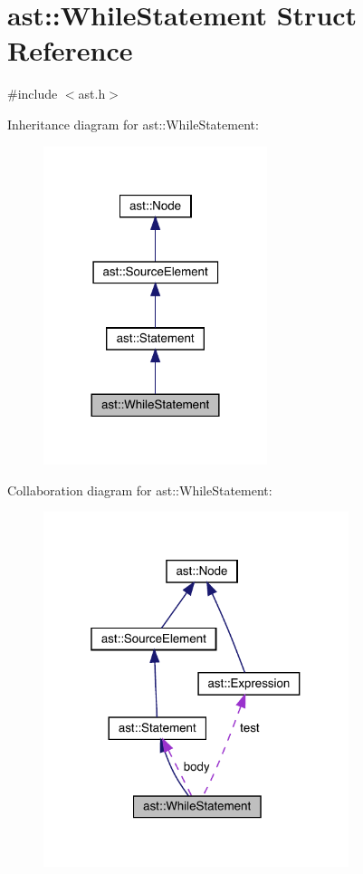\hypertarget{structast_1_1_while_statement}{}\section{ast\+:\+:While\+Statement Struct Reference}
\label{structast_1_1_while_statement}


{\ttfamily \#include $<$ast.\+h$>$}



Inheritance diagram for ast\+:\+:While\+Statement\+:
\nopagebreak
\begin{figure}[H]
\begin{center}
\leavevmode
\includegraphics[width=185pt]{structast_1_1_while_statement__inherit__graph}
\end{center}
\end{figure}


Collaboration diagram for ast\+:\+:While\+Statement\+:
\nopagebreak
\begin{figure}[H]
\begin{center}
\leavevmode
\includegraphics[width=253pt]{structast_1_1_while_statement__coll__graph}
\end{center}
\end{figure}
